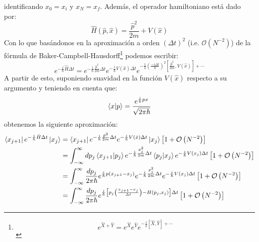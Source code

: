 \documentclass[11pt,a4paper]{article}
\begin{document}
identificando $x_0 = x_i$ y $x_N = x_f$. Adem\'as, el operador hamiltoniano est\'a dado por:
\begin{equation}
\hat{H}(\hat{p},\hat{x}) = \frac{\hat{p}^2}{2m} + V(\hat{x})
\label{eq:hamiltonian}
\end{equation}
Con lo que bas\'andonos en la aproximaci\'on a orden $(\Delta t)^2$ (i.e. $\mathcal{O}(N^{-2})$) de la f\'ormula de Baker-Campbell-Hausdorff\footnote{
\begin{equation}
e^{\hat{X} + \hat{Y}} = e^{\hat{X}}e^{\hat{Y}}e^{-\frac{1}{2}[\hat{X},\hat{Y}] + \cdots}
\label{eq:haussdorf}
\end{equation}}
podemos escribir:
\begin{equation}
e^{-\frac{i}{\hbar}\hat{H}\Delta t} = e^{-\frac{i}{\hbar}\frac{\hat{p}^2}{2m}\Delta t} e^{-\frac{i}{\hbar}V(\hat{x})\Delta t} e^{-\frac{1}{2}\left( \frac{-i\Delta t}{\hbar} \right)^2\left[\frac{\hat{p}^2}{2m}, V(\hat{x})\right] + \cdots}
\label{eq:Propagator5}
\end{equation}
A partir de esto, suponiendo suavidad en la funci\'on $V(\hat{x})$ respecto a su argumento y teniendo en cuenta que:
\begin{equation}
\braket{x|p} = \frac{e^{\frac{i}{\hbar}px}}{\sqrt{2\pi\hbar}}
\label{eq:braxketp}
\end{equation}
obtenemos la siguiente aproximaci\'on:
\begin{equation}
\begin{split}
\bra{x_{j+1}}e^{-\frac{i}{\hbar}\hat{H}\Delta t}\ket{x_j} & = \bra{x_{j+1}}e^{-\frac{i}{\hbar}\frac{\hat{p}^2}{2m}\Delta t} e^{-\frac{i}{\hbar}V(\hat{x})\Delta t} \ket{x_j} \left[ 1 + \mathcal{O}\left( N^{-2} \right) \right] \\
& = \int_{-\infty}^{\infty}dp_j \braket{x_{j+1}|p_j}e^{-\frac{i}{\hbar}\frac{p_{j}^2}{2m}\Delta t}\braket{p_j|x_j}e^{-\frac{i}{\hbar}V(x_j)\Delta t}\left[ 1 + \mathcal{O}\left( N^{-2} \right) \right] \\
& = \int_{-\infty}^{\infty}\frac{dp_j}{2\pi\hbar} e^{\frac{i}{\hbar}p(x_{j+1}-x_j)} e^{-\frac{i}{\hbar}\frac{p_{j}^2}{2m}\Delta t}e^{-\frac{i}{\hbar}V(x_j)\Delta t}\left[ 1 + \mathcal{O}\left( N^{-2} \right) \right] \\
& = \int_{-\infty}^{\infty}\frac{dp_j}{2\pi\hbar} e^{\frac{i}{\hbar}\left[p_j\left( \frac{x_{j+1}-x_j}{\Delta t} \right) - H(p_j,x_j)\right]\Delta t } \left[ 1 + \mathcal{O} \left( N^{-2} \right) \right]
\label{eq:Propagator6}
\end{split}
\end{equation}
\end{document}
